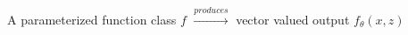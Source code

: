 \documentclass[preview]{standalone}
\begin{document}
A parameterized function class $f$ $\xrightarrow{produces}$ vector valued output $f_\theta(x, z)$\\
\end{document}
